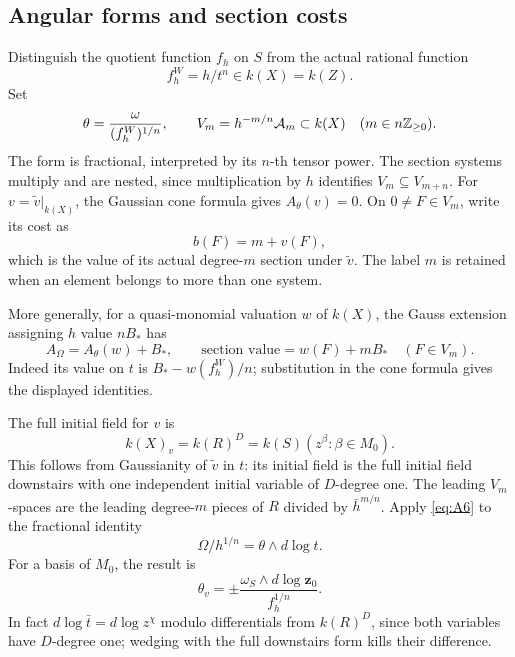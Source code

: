 \subsection{Angular forms and section costs}
\label{a:angular}

Distinguish the quotient function \(f_h\) on \(S\) from the actual
rational function
\[
                     f_h^W=h/t^n\in k(X)=k(Z).
\]
Set
\[
 \theta=\frac{\omega}{(f_h^W)^{1/n}},\qquad
 V_m=h^{-m/n}\mathcal A_m\subset k(X)
                    \quad(m\in n\mathbb Z_{\geq0}).
\]
The form is fractional, interpreted by its \(n\)-th tensor power.
The section systems multiply and are nested, since multiplication by
\(h\) identifies \(V_m\subseteq V_{m+n}\). For
\(v=\tilde v|_{k(X)}\), the Gaussian cone formula gives
\(A_\theta(v)=0\). On \(0\ne F\in V_m\), write its cost as
\[
                              b(F)=m+v(F),
\]
which is the value of its actual degree-\(m\) section under
\(\tilde v\). The label \(m\) is retained when an element belongs
to more than one system.

More generally, for a quasi-monomial valuation \(w\) of \(k(X)\), the
Gauss extension assigning \(h\) value \(nB_*\) has
\[
 A_\Omega=A_\theta(w)+B_*,\qquad
             \text{section value}=w(F)+mB_*\quad(F\in V_m).
\]
Indeed its value on \(t\) is \(B_*-w(f_h^W)/n\); substitution in the
cone formula gives the displayed identities.

The full initial field for \(v\) is
\[
          k(X)_v=k(R)^D=k(S)(z^\beta:\beta\in M_0).
\]
This follows from Gaussianity of \(\tilde v\) in \(t\): its initial
field is the full initial field downstairs with one independent initial
variable of \(D\)-degree one. The leading \(V_m\)-spaces are the
leading degree-\(m\) pieces of \(R\) divided by \(\bar h^{m/n}\).
Apply \eqref{eq:A6} to the fractional identity
\[
                \Omega/h^{1/n}=\theta\wedge d\log t.
\]
For a basis of \(M_0\), the result is
\[
              \theta_v=\pm\frac{\omega_S\wedge
                                      d\log\mathbf z_0}{f_h^{1/n}}.
\]
In fact \(d\log\bar t=d\log z^\chi\) modulo differentials from
\(k(R)^D\), since both variables have \(D\)-degree one; wedging with
the full downstairs form kills their difference.

